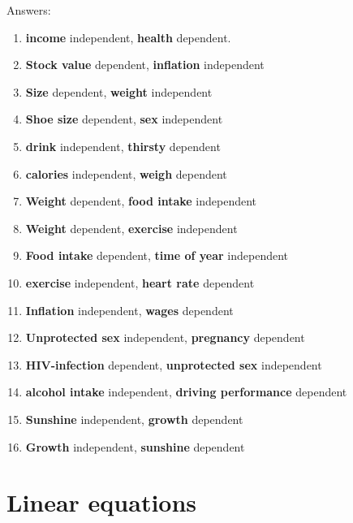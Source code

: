 \documentclass[]{book}\usepackage[]{graphicx}\usepackage[]{color}
\begin{document}
Answers:

\begin{enumerate}

\item \textbf{income} independent, \textbf{health} dependent.
\item \textbf{Stock value} dependent, \textbf{inflation} independent
\item \textbf{Size} dependent, \textbf{weight} independent
\item \textbf{Shoe size} dependent, \textbf{sex} independent
\item \textbf{drink} independent, \textbf{thirsty} dependent
\item \textbf{calories} independent, \textbf{weigh} dependent
\item \textbf{Weight} dependent, \textbf{food intake} independent
\item \textbf{Weight} dependent, \textbf{exercise} independent
\item \textbf{Food intake} dependent, \textbf{time of year} independent
\item \textbf{exercise} independent, \textbf{heart rate} dependent
\item \textbf{Inflation} independent, \textbf{wages} dependent
\item \textbf{Unprotected sex} independent, \textbf{pregnancy} dependent
\item \textbf{HIV-infection} dependent, \textbf{unprotected sex} independent
\item \textbf{alcohol intake} independent, \textbf{driving performance} dependent
\item \textbf{Sunshine} independent, \textbf{growth} dependent
\item \textbf{Growth} independent, \textbf{sunshine} dependent

\end{enumerate}



\section{Linear equations}
\end{document}
